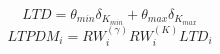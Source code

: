 \begin{equation}
LTD =\theta_{min} \delta_{K_{min}} +\theta_{max} \delta_{K_{max}}
\end{equation}
\begin{equation}
LTPDM_i =RW^{(\gamma)}_iRW^{(K)}_iLTD_i
\end{equation}